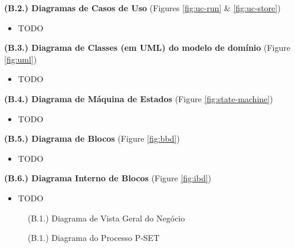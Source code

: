 \documentclass[12pt,a4paper]{article}
\begin{document}
\begin{tcolorbox}[enhanced jigsaw,colback=bg,boxrule=0pt,arc=4pt]
  \begin{small}
    \textbf{(B.2.) Diagramas de Casos de Uso} (Figures \ref{fig:uc-run} \& \ref{fig:uc-store})
  \end{small}
  \begin{itemize}
    \item TODO
  \end{itemize}

  \begin{small}
    \textbf{(B.3.) Diagrama de Classes (em UML) do modelo de domínio} (Figure \ref{fig:uml})
  \end{small}
  \begin{itemize}
    \item TODO
  \end{itemize}

  \begin{small}
    \textbf{(B.4.) Diagrama de Máquina de Estados} (Figure \ref{fig:state-machine})
  \end{small}
  \begin{itemize}
    \item TODO
  \end{itemize}

  \begin{small}
    \textbf{(B.5.) Diagrama de Blocos} (Figure \ref{fig:bbd})
  \end{small}
  \begin{itemize}
    \item TODO
  \end{itemize}

  \begin{small}
    \textbf{(B.6.) Diagrama Interno de Blocos} (Figure \ref{fig:ibd})
  \end{small}
  \begin{itemize}
    \item TODO
  \end{itemize}
\end{tcolorbox}

\begin{landscape}
  \begin{figure}
    \centering
    
    \caption{(B.1.) Diagrama de Vista Geral do Negócio}
    \label{fig:archimate}
  \end{figure}
\end{landscape}

\begin{landscape}
  \begin{figure}
    \centering
    
    \caption{(B.1.) Diagrama do Processo P-SET}
    \label{fig:p-set-bpmn}
  \end{figure}
\end{landscape}
\end{document}
